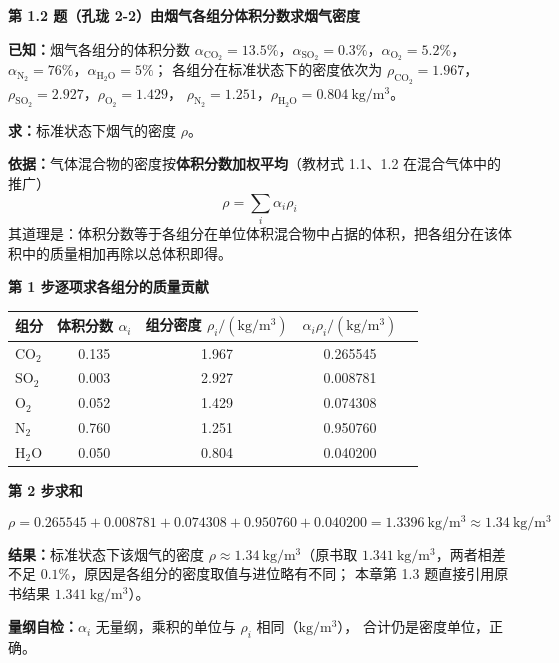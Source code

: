 \noindent\textbf{第 1.2 题（孔珑 2-2）\quad 由烟气各组分体积分数求烟气密度}

\begin{jie}
\textbf{已知：}烟气各组分的体积分数
$\alpha_{\mathrm{CO_2}}=13.5\%$，$\alpha_{\mathrm{SO_2}}=0.3\%$，$\alpha_{\mathrm{O_2}}=5.2\%$，
$\alpha_{\mathrm{N_2}}=76\%$，$\alpha_{\mathrm{H_2O}}=5\%$；
各组分在标准状态下的密度依次为
$\rho_{\mathrm{CO_2}}=1.967$，$\rho_{\mathrm{SO_2}}=2.927$，$\rho_{\mathrm{O_2}}=1.429$，
$\rho_{\mathrm{N_2}}=1.251$，$\rho_{\mathrm{H_2O}}=0.804\ \mathrm{kg/m^3}$。

\textbf{求：}标准状态下烟气的密度 $\rho$。

\textbf{依据：}气体混合物的密度按\textbf{体积分数加权平均}（教材式 1.1、1.2 在混合气体中的推广）
\[ \rho=\sum_i \alpha_i\rho_i \]
其道理是：体积分数等于各组分在单位体积混合物中占据的体积，把各组分在该体积中的质量相加再除以总体积即得。

\textbf{第 1 步\quad 逐项求各组分的质量贡献}

\begin{center}
\begin{tabularx}{\textwidth}{@{}lcccc@{}}
\toprule
组分 & 体积分数 $\alpha_i$ & 组分密度 $\rho_i/(\mathrm{kg/m^3})$ & $\alpha_i\rho_i/(\mathrm{kg/m^3})$ \\
\midrule
$\mathrm{CO_2}$ & 0.135 & 1.967 & 0.265545 \\
$\mathrm{SO_2}$ & 0.003 & 2.927 & 0.008781 \\
$\mathrm{O_2}$   & 0.052 & 1.429 & 0.074308 \\
$\mathrm{N_2}$   & 0.760 & 1.251 & 0.950760 \\
$\mathrm{H_2O}$  & 0.050 & 0.804 & 0.040200 \\
\bottomrule
\end{tabularx}
\end{center}

\textbf{第 2 步\quad 求和}

\[ \rho=0.265545+0.008781+0.074308+0.950760+0.040200=1.3396\ \mathrm{kg/m^3}\approx1.34\ \mathrm{kg/m^3} \]

\textbf{结果：}标准状态下该烟气的密度 $\rho\approx1.34\ \mathrm{kg/m^3}$（原书取
$1.341\ \mathrm{kg/m^3}$，两者相差不足 $0.1\%$，原因是各组分的密度取值与进位略有不同；
本章第 1.3 题直接引用原书结果 $1.341\ \mathrm{kg/m^3}$）。

\textbf{量纲自检：}$\alpha_i$ 无量纲，乘积的单位与 $\rho_i$ 相同（$\mathrm{kg/m^3}$），
合计仍是密度单位，正确。
\end{jie}

